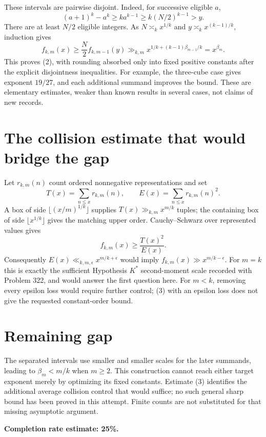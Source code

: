 \documentclass[11pt]{article}
\begin{document}
These intervals are pairwise disjoint. Indeed, for successive eligible $a$,
\[
 (a+1)^k-a^k\ge k a^{k-1}\ge k(N/2)^{k-1}>y.
\]
There are at least $N/2$ eligible integers. As $N\asymp_k x^{1/k}$ and $y\asymp_k x^{(k-1)/k}$, induction gives
\[
 f_{k,m}(x)\ge\frac N2 f_{k,m-1}(y)
 \gg_{k,m}x^{1/k+(k-1)\beta_{m-1}/k}=x^{\beta_m}.
\]
This proves (2), with rounding absorbed only into fixed positive constants after the explicit disjointness inequalities. For example, the three-cube case gives exponent $19/27$, and each additional summand improves the bound. These are elementary estimates, weaker than known results in several cases, not claims of new records.

\section*{The collision estimate that would bridge the gap}
Let $r_{k,m}(n)$ count ordered nonnegative representations and set
\[
 T(x)=\sum_{n\le x}r_{k,m}(n),\qquad
 E(x)=\sum_{n\le x}r_{k,m}(n)^2.
\]
A box of side $\lfloor(x/m)^{1/k}\rfloor$ supplies $T(x)\gg_{k,m}x^{m/k}$ tuples; the containing box of side $\lfloor x^{1/k}\rfloor$ gives the matching upper order. Cauchy--Schwarz over represented values gives
\[
 f_{k,m}(x)\ge\frac{T(x)^2}{E(x)}. \tag{3}
\]
Consequently $E(x)\ll_{k,m,\epsilon}x^{m/k+\epsilon}$ would imply $f_{k,m}(x)\gg x^{m/k-\epsilon}$. For $m=k$ this is exactly the sufficient Hypothesis $K^*$ second-moment scale recorded with Problem 322, and would answer the first question here. For $m<k$, removing every epsilon loss would require further control; (3) with an epsilon loss does not give the requested constant-order bound.

\section*{Remaining gap}
The separated intervals use smaller and smaller scales for the later summands, leading to $\beta_m<m/k$ when $m\ge2$. This construction cannot reach either target exponent merely by optimizing its fixed constants. Estimate (3) identifies the additional average collision control that would suffice; no such general sharp bound has been proved in this attempt. Finite counts are not substituted for that missing asymptotic argument.

\textbf{Completion rate estimate: 25\%.}
\end{document}
